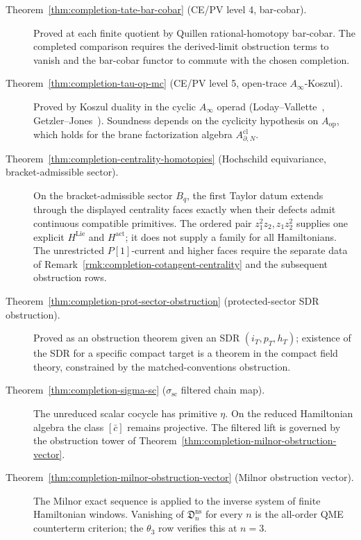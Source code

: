 \begin{description}
\item[Theorem~\ref{thm:completion-tate-bar-cobar} (CE/PV level 4,
  bar-cobar).]  Proved at each finite quotient by Quillen
  rational-homotopy bar-cobar.  The completed comparison requires the
  derived-limit obstruction terms to vanish and the bar-cobar functor
  to commute with the chosen completion.

\item[Theorem~\ref{thm:completion-tau-op-mc} (CE/PV level 5,
  open-trace \(A_\infty\)-Koszul).]  Proved by Koszul duality in
  the cyclic \(A_\infty\) operad (Loday--Vallette~\cite{loday-vallette},
  Getzler--Jones~\cite{getzler-jones-aoperad}).  Soundness depends on the cyclicity hypothesis
  on \(A_{\mathrm{op}}\), which holds for the brane factorization
  algebra \(A^{\mathrm{cl}}_{\partial,N}\).

\item[Theorem~\ref{thm:completion-centrality-homotopies} (Hochschild
  equivariance, bracket-admissible sector).]  On the
  bracket-admissible sector \(B_q\), the first Taylor datum extends
  through the displayed centrality faces exactly when their defects
  admit continuous compatible primitives.  The ordered pair
  \(z_1^2z_2,z_1z_2^2\) supplies one explicit
  \(H^{\mathrm{Lie}}\) and \(H^{\mathrm{act}}\); it does not supply a
  family for all Hamiltonians.  The unrestricted \(P[1]\)-current and
  higher faces require the separate data of
  Remark~\ref{rmk:completion-cotangent-centrality} and the subsequent
  obstruction rows.

\item[Theorem~\ref{thm:completion-prot-sector-obstruction}
  (protected-sector SDR obstruction).]  Proved as an obstruction
  theorem given an SDR \((i_T,p_T,h_T)\); existence of the SDR
  for a specific compact target is a theorem in the compact field
  theory, constrained by the matched-conventions obstruction.

\item[Theorem~\ref{thm:completion-sigma-sc} (\(\sigma_{\mathrm{sc}}\)
  filtered chain map).]  The unreduced scalar cocycle has primitive
  \(\eta\).  On the reduced Hamiltonian algebra the class
  \([\bar c]\) remains projective.  The filtered lift is governed by
  the obstruction tower of
  Theorem~\ref{thm:completion-milnor-obstruction-vector}.

\item[Theorem~\ref{thm:completion-milnor-obstruction-vector}
  (Milnor obstruction vector).]  The Milnor exact sequence is applied
  to the inverse system of finite Hamiltonian windows.  Vanishing of
  \(\mathfrak D^{\mathrm{ns}}_n\)
  for every \(n\) is the all-order QME counterterm criterion; the
  \(\theta_3\) row verifies this at \(n=3\).


\end{description}
